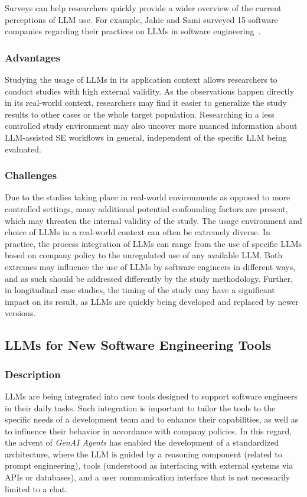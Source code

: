 Surveys can help researchers quickly provide a wider overview of the current perceptions of LLM use.
For example, Jahic and Sami surveyed 15 software companies regarding their practices on LLMs in software engineering~\cite{DBLP:conf/icsa/JahicS24}.

\subsubsection{Advantages}

Studying the usage of LLMs in its application context allows researchers to conduct studies with high external validity.
As the observations happen directly in its real-world context, researchers may find it easier to generalize the study results to other cases or the whole target population.
Researching in a less controlled study environment may also uncover more nuanced information about LLM-assisted SE workflows in general, independent of the specific LLM being evaluated.

\subsubsection{Challenges}

Due to the studies taking place in real-world environments as opposed to more controlled settings, many additional potential confounding factors are present, which may threaten the internal validity of the study.
The usage environment and choice of LLMs in a real-world context can often be extremely diverse.
In practice, the process integration of LLMs can range from the use of specific LLMs based on company policy to the unregulated use of any available LLM. 
Both extremes may influence the use of LLMs by software engineers in different ways, and as such should be addressed differently by the study methodology.
Further, in longitudinal case studies, the timing of the study may have a significant impact on its result, as LLMs are quickly being developed and replaced by newer versions.

\subsection{LLMs for New Software Engineering Tools}

\subsubsection{Description}

LLMs are being integrated into new tools designed to support software engineers in their daily tasks.
Such integration is important to tailor the tools to the specific needs of a development team and to enhance their capabilities, as well as to influence their behavior in accordance with company policies.
In this regard, the advent of \textit{GenAI Agents} has enabled the development of a standardized architecture, where the LLM is guided by a reasoning component (related to prompt engineering), tools (understood as interfacing with external systems via APIs or databases), and a user communication interface that is not necessarily limited to a chat.

